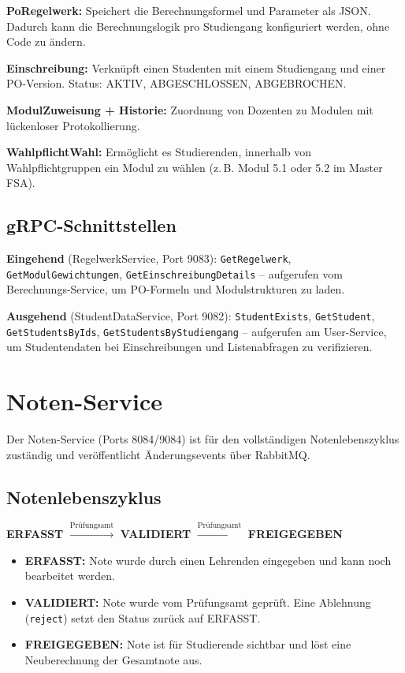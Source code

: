 \documentclass[12pt,a4paper,ngerman]{article}
\begin{document}
\textbf{PoRegelwerk:} Speichert die Berechnungsformel und Parameter als JSON. Dadurch kann die Berechnungslogik pro Studiengang konfiguriert werden, ohne Code zu ändern.

\textbf{Einschreibung:} Verknüpft einen Studenten mit einem Studiengang und einer PO-Version. Status: AKTIV, ABGESCHLOSSEN, ABGEBROCHEN.

\textbf{ModulZuweisung + Historie:} Zuordnung von Dozenten zu Modulen mit lückenloser Protokollierung.

\textbf{WahlpflichtWahl:} Ermöglicht es Studierenden, innerhalb von Wahlpflichtgruppen ein Modul zu wählen (z.\,B. Modul 5.1 oder 5.2 im Master FSA).

\subsection{gRPC-Schnittstellen}

\textbf{Eingehend} (RegelwerkService, Port 9083): \texttt{GetRegelwerk}, \texttt{GetModulGewichtungen}, \texttt{GetEinschreibungDetails} -- aufgerufen vom Berechnungs-Service, um PO-Formeln und Modulstrukturen zu laden.

\textbf{Ausgehend} (StudentDataService, Port 9082): \texttt{StudentExists}, \texttt{GetStudent}, \texttt{GetStudentsByIds}, \texttt{GetStudentsByStudiengang} -- aufgerufen am User-Service, um Studentendaten bei Einschreibungen und Listenabfragen zu verifizieren.

\section{Noten-Service}

Der Noten-Service (Ports 8084/9084) ist für den vollständigen Notenlebenszyklus zuständig und veröffentlicht Änderungsevents über RabbitMQ.

\subsection{Notenlebenszyklus}

\begin{center}
\textbf{ERFASST} $\xrightarrow{\text{Prüfungsamt}}$ \textbf{VALIDIERT} $\xrightarrow{\text{Prüfungsamt}}$ \textbf{FREIGEGEBEN}
\end{center}

\begin{itemize}[nosep]
\item \textbf{ERFASST:} Note wurde durch einen Lehrenden eingegeben und kann noch bearbeitet werden.
\item \textbf{VALIDIERT:} Note wurde vom Prüfungsamt geprüft. Eine Ablehnung (\texttt{reject}) setzt den Status zurück auf ERFASST.
\item \textbf{FREIGEGEBEN:} Note ist für Studierende sichtbar und löst eine Neuberechnung der Gesamtnote aus.
\end{itemize}
\end{document}
